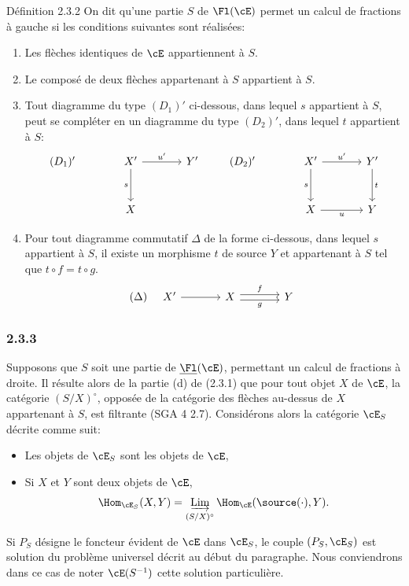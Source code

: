 \begin{statement}{Définition 2.3.2}
On dit qu'une partie $S$ de $\Fl(\cE)$ permet un calcul de fractions à gauche si les conditions suivantes sont réalisées:
\begin{enumerate}[label=(\alph*)]
\item[(a')] Les flèches identiques de $\cE$ appartiennent à $S$.
\item[(b')] Le composé de deux flèches appartenant à $S$ appartient à $S$.
\item[(c')] Tout diagramme du type $(D_1)'$ ci-dessous, dans lequel $s$ appartient à $S$,
peut se compléter en un diagramme du type $(D_2)'$, dans lequel $t$ appartient à $S$:
\[
\begin{tikzcd}[column sep=large,row sep=large]
(D_1)'& X' \arrow[r,"u'"] \arrow[d,"s"'] & Y'\\
& X
\end{tikzcd}
\qquad
\begin{tikzcd}[column sep=large,row sep=large]
(D_2)'& X' \arrow[r,"u'"] \arrow[d,"s"'] & Y' \arrow[d,"t"]\\
& X \arrow[r,"u"'] & Y
\end{tikzcd}
\]
\item[(d)'] Pour tout diagramme commutatif $\Delta$ de la forme ci-dessous, dans lequel $s$ appartient à $S$, il existe un morphisme $t$ de source $Y$ et appartenant à $S$ tel que $t\circ f=t\circ g$.
\[
(\Delta)\quad
\begin{tikzcd}[column sep=large]
X' \arrow[r] & X \arrow[r,shift left,"f"] \arrow[r,shift right,"g"'] & Y
\end{tikzcd}
\]
\end{enumerate}
\end{statement}

\subsubsection*{2.3.3}
Supposons que $S$ soit une partie de $\underline{\Fl}(\cE)$, permettant un calcul de fractions à droite. Il résulte alors de la partie (d) de (2.3.1) que pour tout objet $X$ de $\cE$, la catégorie $(S/X)^\circ$, opposée de la catégorie des flèches au-dessus de $X$ appartenant à $S$, est filtrante (SGA 4  2.7). Considérons alors la catégorie $\cE_S$ décrite comme suit:
\begin{itemize}[label=-]
\item Les objets de $\cE_S$ sont les objets de $\cE$,
\item Si $X$ et $Y$ sont deux objets de $\cE$,
\[
\Hom_{\cE_S}(X,Y)=\mathop{\underrightarrow{\mathrm{Lim}}}\limits_{(S/X)^\circ}\Hom_{\cE}(\source(\cdot),Y).
\]
\end{itemize}
Si $P_S$ désigne le foncteur évident de $\cE$ dans $\cE_S$, le couple $(P_S,\cE_S)$ est solution du problème universel décrit au début du paragraphe. Nous conviendrons dans ce cas de noter $\cE(S^{-1})$ cette solution particulière.

